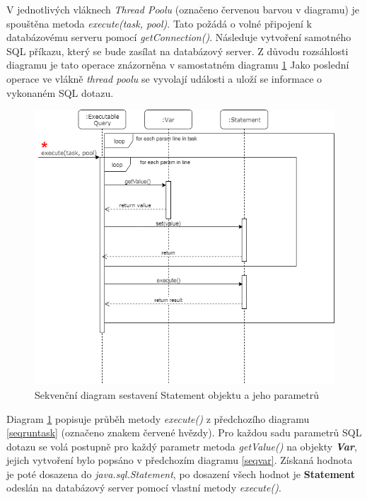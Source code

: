 \documentclass[czech,bachelor,public,dept460,male,cpdeclaration,twoside]{diploma}
\begin{document}
V jednotlivých vláknech \textit{Thread Poolu} (označeno červenou barvou v diagramu) je spouštěna metoda \textit{execute(task, pool)}. Tato požádá o volné připojení k databázovému serveru pomocí \textit{getConnection()}. Následuje vytvoření samotného SQL příkazu, který se bude zasílat na databázový server. Z důvodu rozsáhlosti diagramu je tato operace znázorněna v samostatném diagramu \ref{getvalues} Jako poslední operace ve vlákně \textit{thread poolu} se vyvolají události a uloží se informace o vykonaném SQL dotazu.


\begin{figure}[!htbp]\centering\includegraphics[width=1.0\textwidth]{Figures/getvalues.png}\caption{Sekvenční diagram sestavení Statement objektu a jeho parametrů}
\label{getvalues}
\end{figure}

Diagram \ref{getvalues} popisuje průběh metody \textit{execute()} z předchozího diagramu \ref{seqruntask} (označeno znakem červené hvězdy). Pro každou sadu parametrů SQL dotazu se volá postupně pro každý parametr metoda \textit{getValue()} na objekty \textbf{\emph{Var}}, jejich vytvoření bylo popsáno v předchozím diagramu \ref{seqvar}. Získaná hodnota je poté dosazena do \textit{java.sql.Statement}, po dosazení všech hodnot je \textbf{Statement} odeslán na databázový server pomocí vlastní metody \textit{execute()}.
\end{document}
